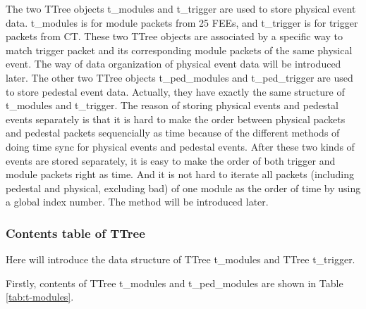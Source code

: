 \documentclass[a4paper, 12pt, onecolumn]{article}
\begin{document}
The two TTree objects t\_modules and t\_trigger are used to store physical event data.
t\_modules is for module packets from 25 FEEs, and t\_trigger is for trigger packets from CT.
These two TTree objects are associated by a specific way to match trigger packet and its corresponding module packets of the same physical event.
The way of data organization of physical event data will be introduced later.
The other two TTree objects t\_ped\_modules and t\_ped\_trigger are used to store pedestal event data.
Actually, they have exactly the same structure of t\_modules and t\_trigger.
The reason of storing physical events and pedestal events separately is that it is hard to make the order between physical packets and pedestal packets sequencially as time 
because of the different methods of doing time sync for physical events and pedestal events.
After these two kinds of events are stored separately, it is easy to make the order of both trigger and module packets right as time.
And it is not hard to iterate all packets (including pedestal and physical, excluding bad) of one module as the order of time by using a global index number.
The method will be introduced later.

\subsubsection{Contents table of TTree}
Here will introduce the data structure of TTree t\_modules and TTree t\_trigger.

Firstly, contents of TTree t\_modules and t\_ped\_modules are shown in Table \ref{tab:t-modules}.
\end{document}
